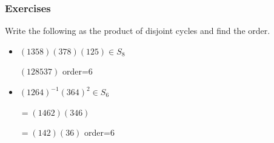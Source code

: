 \newpage
\subsubsection{Exercises}

\begin{example}
    Write the following as the product of disjoint cycles
    and find the order.

    \begin{itemize}
        \item \((1358)(378)(125)\in S_8\)
        
        \((128537)\) order=6
        \item \((1264)^{-1}(364)^2\in S_6\)
        
        \(=(1462)(346)\)

        \(=(142)(36)\) order=6
    \end{itemize}
\end{example}

